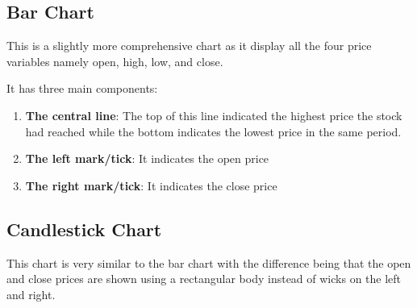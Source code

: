 \subsection{Bar Chart}
This is a slightly more comprehensive chart as it display all the four price variables namely open, high, low, and close.

It has three main components:
\begin{enumerate}
  \item \textbf{The central line}: The top of this line indicated the highest price the stock had reached while the bottom indicates the lowest price in the same period.
  \item \textbf{The left mark/tick}: It indicates the open price
  \item \textbf{The right mark/tick}: It indicates the close price
\end{enumerate}


\subsection{Candlestick Chart}
This chart is very similar to the bar chart with the difference being that the open and close prices are shown using a rectangular body instead of wicks on the left and right.

